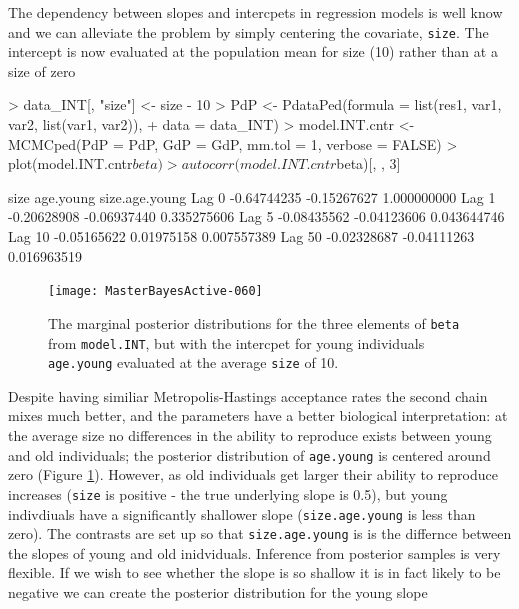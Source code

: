 \documentclass{article}
\begin{document}
The dependency between slopes and intercpets in regression models is well know and we can alleviate the problem by simply centering the covariate, \texttt{size}.  The intercept is now evaluated at the population mean for size (10) rather than at a size of zero

\begin{Schunk}
\begin{Sinput}
> data_INT[, "size"] <- size - 10
> PdP <- PdataPed(formula = list(res1, var1, var2, list(var1, var2)), 
+     data = data_INT)
> model.INT.cntr <- MCMCped(PdP = PdP, GdP = GdP, mm.tol = 1, verbose = FALSE)
> plot(model.INT.cntr$beta)
> autocorr(model.INT.cntr$beta)[, , 3]
\end{Sinput}
\begin{Soutput}
              size   age.young size.age.young
Lag 0  -0.64744235 -0.15267627    1.000000000
Lag 1  -0.20628908 -0.06937440    0.335275606
Lag 5  -0.08435562 -0.04123606    0.043644746
Lag 10 -0.05165622  0.01975158    0.007557389
Lag 50 -0.02328687 -0.04111263    0.016963519
\end{Soutput}
\end{Schunk}


\begin{figure}[!h]
\begin{center}
\texttt{[image: MasterBayesActive-060]}
\end{center}
\caption{The marginal posterior distributions for the three elements of \texttt{beta} from \texttt{model.INT}, but with the intercpet for young individuals \texttt{age.young} evaluated at the average \texttt{size} of 10.  }
\label{INT.cntr-fig}
\end{figure}

Despite having similiar Metropolis-Hastings acceptance rates the second chain mixes much better, and the parameters have a better biological interpretation: at the average size no differences in the ability to reproduce exists between young and old individuals;  the posterior distribution of \texttt{age.young} is centered around zero (Figure \ref{INT.cntr-fig}).  However, as old individuals get larger their ability to reproduce increases (\texttt{size} is positive - the true underlying slope is 0.5), but young indivdiuals have a significantly shallower slope (\texttt{size.age.young} is less than zero).  The contrasts are set up so that \texttt{size.age.young} is is the differnce between the slopes of young and old inidviduals.  Inference from posterior samples is very flexible.  If we wish to see whether the slope is so shallow it is in fact likely to be negative we can create the posterior distribution for the young slope
\end{document}
